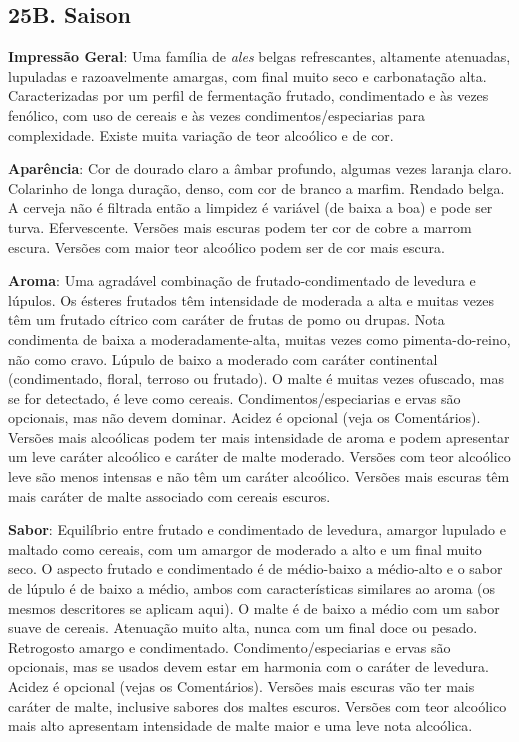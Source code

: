 \subsection*{25B. Saison}
\textbf{Impressão Geral}: Uma família de \textit{ales} belgas refrescantes, altamente atenuadas, lupuladas e razoavelmente amargas, com final muito seco e carbonatação alta. Caracterizadas por um perfil de fermentação frutado, condimentado e às vezes fenólico, com uso de cereais e às vezes condimentos/especiarias para complexidade. Existe muita variação de teor alcoólico e de cor.

\textbf{Aparência}: Cor de dourado claro a âmbar profundo, algumas vezes laranja claro. Colarinho de longa duração, denso, com cor de branco a marfim. Rendado belga. A cerveja não é filtrada então a limpidez é variável (de baixa a boa) e pode ser turva. Efervescente.
Versões mais escuras podem ter cor de cobre a marrom escura. Versões com maior teor alcoólico podem ser de cor mais escura.

\textbf{Aroma}: Uma agradável combinação de frutado-condimentado de levedura e lúpulos. Os ésteres frutados têm intensidade de moderada a alta e muitas vezes têm um frutado cítrico com caráter de frutas de pomo ou drupas. Nota condimenta de baixa a moderadamente-alta, muitas vezes como pimenta-do-reino, não como cravo. Lúpulo de baixo a moderado com caráter continental (condimentado, floral, terroso ou frutado). O malte é muitas vezes ofuscado, mas se for detectado, é leve como cereais. Condimentos/especiarias e ervas são opcionais, mas não devem dominar. Acidez é opcional (veja os Comentários).
Versões mais alcoólicas podem ter mais intensidade de aroma e podem apresentar um leve caráter alcoólico e caráter de malte moderado. Versões com teor alcoólico leve são menos intensas e não têm um caráter alcoólico. Versões mais escuras têm mais caráter de malte associado com cereais escuros.

\textbf{Sabor}: Equilíbrio entre frutado e condimentado de levedura, amargor lupulado e maltado como cereais, com um amargor de moderado a alto e um final muito seco. O aspecto frutado e condimentado é de médio-baixo a médio-alto e o sabor de lúpulo é de baixo a médio, ambos com características similares ao aroma (os mesmos descritores se aplicam aqui). O malte é de baixo a médio com um sabor suave de cereais. Atenuação muito alta, nunca com um final doce ou pesado. Retrogosto amargo e condimentado. Condimento/especiarias e ervas são opcionais, mas se usados devem estar em harmonia com o caráter de levedura. Acidez é opcional (vejas os Comentários).
Versões mais escuras vão ter mais caráter de malte, inclusive sabores dos maltes escuros. Versões com teor alcoólico mais alto apresentam intensidade de malte maior e uma leve nota alcoólica.


